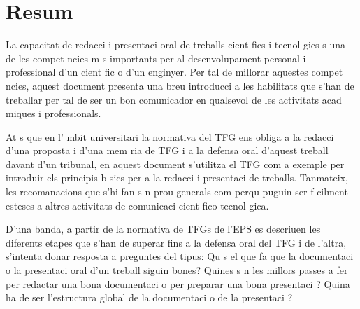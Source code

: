\chapter{Resum}

La capacitat de redacci  i presentaci  oral de treballs cient fics i tecnol gics  s una de les compet ncies m s importants per al desenvolupament personal i professional d'un cient fic o d'un enginyer. Per tal de millorar aquestes compet ncies, aquest document presenta una breu introducci  a les habilitats que s'han de treballar per tal de ser un bon comunicador en qualsevol de les activitats acad miques i professionals.

At s que en l' mbit universitari la normativa del \ac{TFG} ens obliga a la redacci  d'una proposta i d'una mem ria de \ac{TFG} i a la defensa oral d'aquest treball davant d'un tribunal, en aquest document s'utilitza el \ac{TFG} com a exemple per introduir els principis b sics per a la redacci  i presentaci  de treballs. Tanmateix, les recomanacions que s'hi fan s n prou generals com perqu  puguin ser f cilment esteses a altres activitats de comunicaci  cient fico-tecnol gica.

D'una banda, a partir de la normativa de \acsp{TFG} de l'\ac{EPS} es descriuen les diferents etapes que s'han de superar fins a la defensa oral del \ac{TFG} i de l'altra, s'intenta donar resposta a preguntes del tipus: Qu   s el que fa que la documentaci  o la presentaci  oral d'un treball siguin bones? Quines s n les millors passes a fer per redactar una bona documentaci  o per preparar una bona presentaci ? Quina ha de ser l'estructura global de la documentaci  o de la presentaci ? 